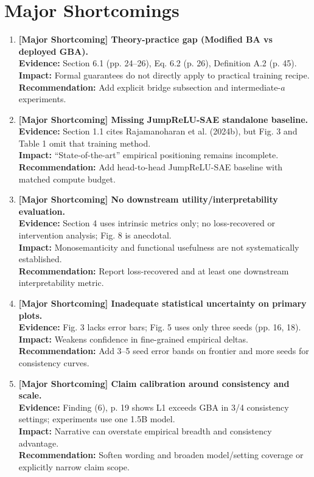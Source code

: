 \documentclass[11pt,a4paper]{article}
\begin{document}
\section{Major Shortcomings}
\begin{enumerate}[leftmargin=*]
\item \textbf{[Major Shortcoming] Theory-practice gap (Modified BA vs deployed GBA).}\\
\textbf{Evidence:} Section 6.1 (pp. 24--26), Eq. 6.2 (p. 26), Definition A.2 (p. 45).\\
\textbf{Impact:} Formal guarantees do not directly apply to practical training recipe.\\
\textbf{Recommendation:} Add explicit bridge subsection and intermediate-$a$ experiments.

\item \textbf{[Major Shortcoming] Missing JumpReLU-SAE standalone baseline.}\\
\textbf{Evidence:} Section 1.1 cites Rajamanoharan et al. (2024b), but Fig. 3 and Table 1 omit that training method.\\
\textbf{Impact:} ``State-of-the-art'' empirical positioning remains incomplete.\\
\textbf{Recommendation:} Add head-to-head JumpReLU-SAE baseline with matched compute budget.

\item \textbf{[Major Shortcoming] No downstream utility/interpretability evaluation.}\\
\textbf{Evidence:} Section 4 uses intrinsic metrics only; no loss-recovered or intervention analysis; Fig. 8 is anecdotal.\\
\textbf{Impact:} Monosemanticity and functional usefulness are not systematically established.\\
\textbf{Recommendation:} Report loss-recovered and at least one downstream interpretability metric.

\item \textbf{[Major Shortcoming] Inadequate statistical uncertainty on primary plots.}\\
\textbf{Evidence:} Fig. 3 lacks error bars; Fig. 5 uses only three seeds (pp. 16, 18).\\
\textbf{Impact:} Weakens confidence in fine-grained empirical deltas.\\
\textbf{Recommendation:} Add 3--5 seed error bands on frontier and more seeds for consistency curves.

\item \textbf{[Major Shortcoming] Claim calibration around consistency and scale.}\\
\textbf{Evidence:} Finding (6), p. 19 shows L1 exceeds GBA in 3/4 consistency settings; experiments use one 1.5B model.\\
\textbf{Impact:} Narrative can overstate empirical breadth and consistency advantage.\\
\textbf{Recommendation:} Soften wording and broaden model/setting coverage or explicitly narrow claim scope.
\end{enumerate}
\end{document}
